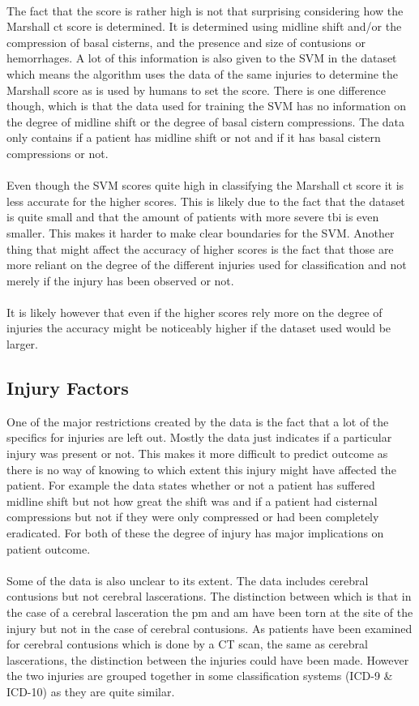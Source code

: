 \documentclass[11pt]{article}
\begin{document}
\\
The fact that the score is rather high is not that surprising considering how the Marshall \gls{ct} score is determined. It is determined using midline shift and/or the compression of basal cisterns, and the presence and size of contusions or hemorrhages. A lot of this information is also given to the SVM in the dataset which means the algorithm uses the data of the same injuries to determine the Marshall score as is used by humans to set the score. There is one difference though, which is that the data used for training the SVM has no information on the degree of midline shift or the degree of basal cistern compressions. The data only contains if a patient has midline shift or not and if it has basal cistern compressions or not.\\
\\
Even though the SVM scores quite high in classifying the Marshall \gls{ct} score it is less accurate for the higher scores. This is likely due to the fact that the dataset is quite small and that the amount of patients with more severe \gls{tbi} is even smaller. This makes it harder to make clear boundaries for the SVM. Another thing that might affect the accuracy of higher scores is the fact that those are more reliant on the degree of the different injuries used for classification and not merely if the injury has been observed or not.\\
\\
It is likely however that even if the higher scores rely more on the degree of injuries the accuracy might be noticeably higher if the dataset used would be larger.

\subsection{Injury Factors}
One of the major restrictions created by the data is the fact that a lot of the specifics for injuries are left out. Mostly the data just indicates if a particular injury was present or not. This makes it more difficult to predict outcome as there is no way of knowing to which extent this injury might have affected the patient. For example the data states whether or not a patient has suffered midline shift but not how great the shift was and if a patient had cisternal compressions but not if they were only compressed or had been completely eradicated. For both of these the degree of injury has major implications on patient outcome.\\
\\
Some of the data is also unclear to its extent. The data includes cerebral contusions but not cerebral lascerations. The distinction between which is that in the case of a cerebral lasceration the \gls{pm} and \gls{am} have been torn at the site of the injury but not in the case of cerebral contusions. As patients have been examined for cerebral contusions which is done by a CT scan\cite{CerebralContusion2020}, the same as cerebral lascerations\cite{CerebralLaceration2018}, the distinction between the injuries could have been made. However the two injuries are grouped together in some classification systems (ICD-9 \& ICD-10\cite{CerebralLaceration2018}\cite{ICD102021}) as they are quite similar.
\end{document}
